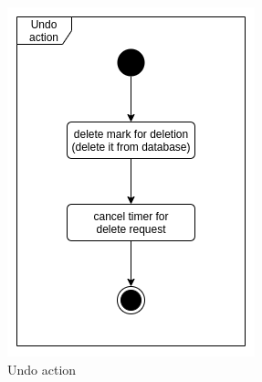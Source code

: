 \begin{figure}
\begin{minipage}[b]{0.45\textwidth}
    	\includegraphics[width=\textwidth]{pics/undo/undo_action.png}
    	\caption[Undo action]{Undo action}\label{fig:undoUndo}
    \end{minipage}
    \begin{minipage}[b]{0.45\textwidth}

\end{minipage}
\end{figure}
